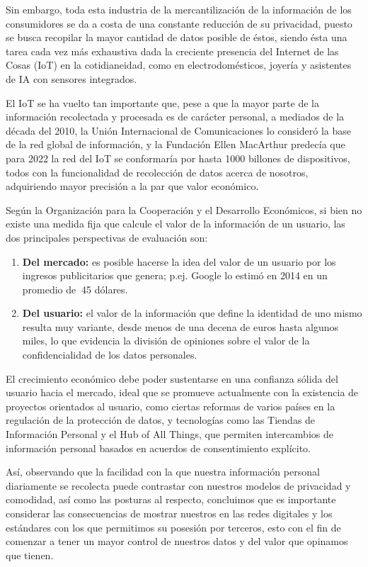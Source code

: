 Sin embargo, toda esta industria de la mercantilización de la información de los consumidores se da a costa de una constante reducción de su privacidad, puesto se busca recopilar la mayor cantidad de datos posible de éstos, siendo ésta una tarea cada vez más exhaustiva dada la creciente presencia del Internet de las Cosas (IoT) en la cotidianeidad, como en electrodomésticos, joyería y asistentes de IA con sensores integrados.

El IoT se ha vuelto tan importante que, pese a que la mayor parte de la información recolectada y procesada es de carácter personal, a mediados de la década del 2010, la Unión Internacional de Comunicaciones lo consideró la base de la red global de información, y la Fundación Ellen MacArthur predecía que para 2022 la red del IoT se conformaría por hasta 1000 billones de dispositivos, todos con la funcionalidad de recolección de datos acerca de nosotros, adquiriendo mayor precisión a la par que valor económico.

Según la Organización para la Cooperación y el Desarrollo Económicos, si bien no existe una medida fija que calcule el valor de la información de un usuario, las dos principales perspectivas de evaluación son:
\begin{enumerate}
    \item \textbf{Del mercado:} es posible hacerse la idea del valor de un usuario por los ingresos publicitarios que genera; p.ej. Google lo estimó en 2014 en un promedio de $~$45 dólares.
    \item \textbf{Del usuario:} el valor de la información que define la identidad de uno mismo resulta muy variante, desde menos de una decena de euros hasta algunos miles, lo que evidencia la división de opiniones sobre el valor de la confidencialidad de los datos personales. 
\end{enumerate}

El crecimiento económico debe poder sustentarse en una confianza sólida del usuario hacia el mercado, ideal que se promueve actualmente con la existencia de proyectos orientados al usuario, como ciertas reformas de varios países en la regulación de la protección de datos, y tecnologías como las Tiendas de Información Personal y el Hub of All Things, que permiten intercambios de información personal basados en acuerdos de consentimiento explícito.

Así, observando que la facilidad con la que nuestra información personal diariamente se recolecta puede contrastar con nuestros modelos de privacidad y comodidad, así como las posturas al respecto, concluimos que es importante considerar las consecuencias de mostrar nuestros en las redes digitales y los estándares con los que permitimos su posesión por terceros, esto con el fin de comenzar a tener un mayor control de nuestros datos y del valor que opinamos que tienen.
